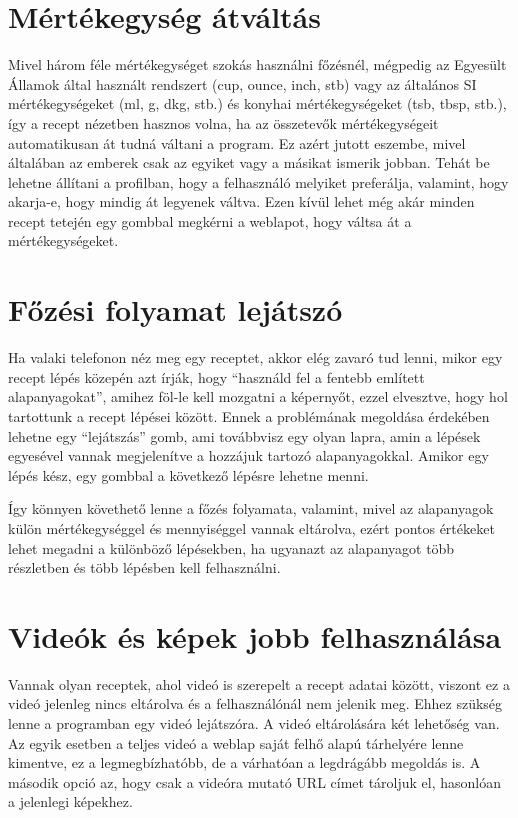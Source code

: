\documentclass[12pt]{report}
\theoremstyle{definition}
\begin{document}
\section{Mértékegység átváltás}
Mivel három féle mértékegységet szokás használni főzésnél, mégpedig az Egyesült Államok által használt rendszert (cup, ounce, inch, stb) vagy az általános SI mértékegységeket (ml, g, dkg, stb.) és konyhai mértékegységeket (tsb, tbsp, stb.), így a recept nézetben hasznos volna, ha az összetevők mértékegységeit automatikusan át tudná váltani a program. Ez azért jutott eszembe, mivel általában az emberek csak az egyiket vagy a másikat ismerik jobban. Tehát be lehetne állítani a profilban, hogy a felhasználó melyiket preferálja, valamint, hogy akarja-e, hogy mindig át legyenek váltva. Ezen kívül lehet még akár minden recept tetején egy gombbal megkérni a weblapot, hogy váltsa át a mértékegységeket.

\section{Főzési folyamat lejátszó}
Ha valaki telefonon néz meg egy receptet, akkor elég zavaró tud lenni, mikor egy recept lépés közepén azt írják, hogy “használd fel a fentebb említett alapanyagokat”, amihez föl-le kell mozgatni a képernyőt, ezzel elvesztve, hogy hol tartottunk a recept lépései között. Ennek a problémának megoldása érdekében lehetne egy “lejátszás” gomb, ami továbbvisz egy olyan lapra, amin a lépések egyesével vannak megjelenítve  a hozzájuk tartozó alapanyagokkal. Amikor egy lépés kész, egy gombbal a következő lépésre lehetne menni. 

Így könnyen követhető lenne a főzés folyamata, valamint, mivel az alapanyagok külön mértékegységgel és mennyiséggel vannak eltárolva, ezért pontos értékeket lehet megadni a különböző lépésekben, ha ugyanazt az alapanyagot több részletben és több lépésben kell felhasználni.


\section{Videók és képek jobb felhasználása}
Vannak olyan receptek, ahol videó is szerepelt a recept adatai között, viszont ez a videó   jelenleg nincs eltárolva és a felhasználónál nem jelenik meg. Ehhez szükség lenne a programban egy videó lejátszóra. A videó eltárolására két lehetőség van. Az egyik esetben a teljes videó a weblap saját felhő alapú tárhelyére lenne kimentve, ez a legmegbízhatóbb, de a várhatóan a legdrágább megoldás is. A második opció az, hogy csak a videóra mutató URL címet tároljuk el, hasonlóan a jelenlegi képekhez.
\end{document}
